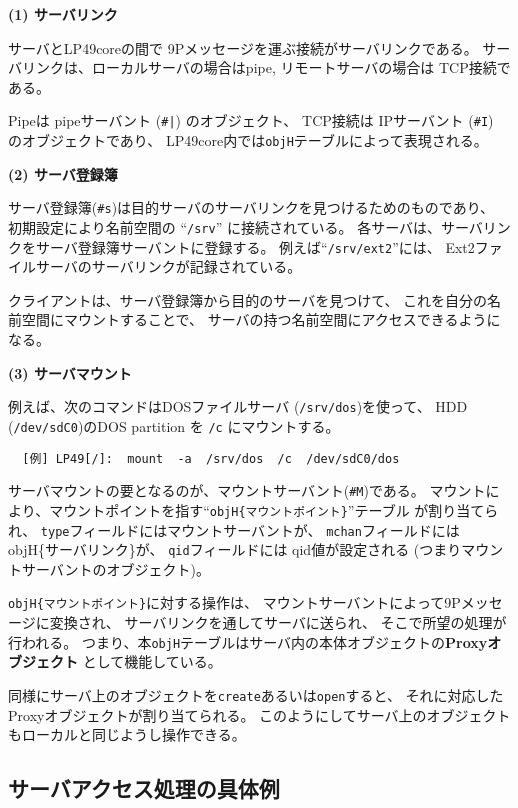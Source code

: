 \documentclass{ipsjpapers}
\begin{document}
{\bf\flushleft (1) サーバリンク}

サーバとLP49coreの間で 9Pメッセージを運ぶ接続がサーバリンクである。
サーバリンクは、ローカルサーバの場合はpipe, 
リモートサーバの場合は TCP接続である。

Pipeは pipeサーバント (\verb$#|$) のオブジェクト、
TCP接続は IPサーバント (\verb|#I|) のオブジェクトであり、
LP49core内では{\tt objH}テーブルによって表現される。



{\bf\flushleft (2) サーバ登録簿}

  サーバ登録簿(\verb|#s|)は目的サーバのサーバリンクを見つけるためのものであり、
  初期設定により名前空間の ``{\tt /srv}'' に接続されている。
  各サーバは、サーバリンクをサーバ登録簿サーバントに登録する。
  例えば``{\tt /srv/ext2}''には、 
  Ext2ファイルサーバのサーバリンクが記録されている。

  クライアントは、サーバ登録簿から目的のサーバを見つけて、
  これを自分の名前空間にマウントすることで、
  サーバの持つ名前空間にアクセスできるようになる。

{\bf\flushleft (3) サーバマウント}

  例えば、次のコマンドはDOSファイルサーバ ({\tt /srv/dos})を使って、
  HDD ({\tt /dev/sdC0})のDOS partition を
  {\tt /c} にマウントする。

\begin{verbatim}
  [例] LP49[/]:  mount  -a  /srv/dos  /c  /dev/sdC0/dos 
\end{verbatim}

   サーバマウントの要となるのが、マウントサーバント(\verb|#M|)である。
   マウントにより、マウントポイントを指す``{\tt objH\{マウントポイント\}}''テーブル
   が割り当てられ、
   {\tt type}フィールドにはマウントサーバントが、
   {\tt mchan}フィールドには objH\{サーバリンク\}が、
   {\tt qid}フィールドには qid値が設定される
   (つまりマウントサーバントのオブジェクト)。
   
   {\tt objH\{マウントポイント\}}に対する操作は、
   マウントサーバントによって9Pメッセージに変換され、
   サーバリンクを通してサーバに送られ、
   そこで所望の処理が行われる。
   つまり、本{\tt objH}テーブルはサーバ内の本体オブジェクトの{\bf Proxyオブジェクト}
   として機能している。

   同様にサーバ上のオブジェクトを{\tt create}あるいは{\tt open}すると、
   それに対応したProxyオブジェクトが割り当てられる。
   このようにしてサーバ上のオブジェクトもローカルと同じようし操作できる。

\subsection{サーバアクセス処理の具体例}
\end{document}
